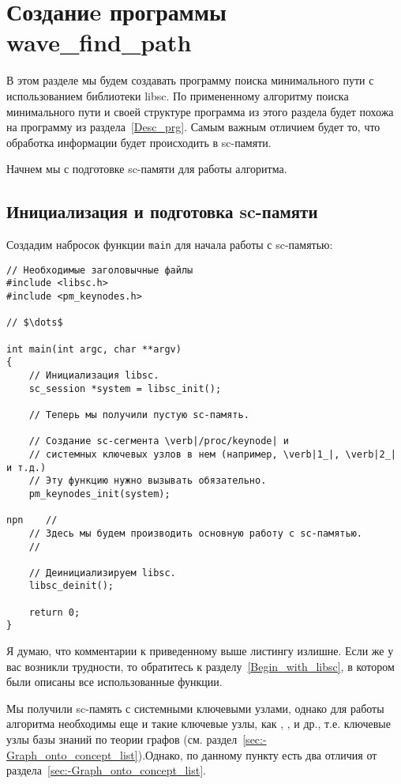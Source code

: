 \section{Созданиe программы wave\_find\_path}
\label{Desc_libscprg}

В этом разделе мы будем создавать программу поиска минимального пути с
использованием библиотеки libsc. По примененному алгоритму поиска
минимального пути и своей структуре программа из этого раздела будет
похожа на программу из раздела~\ref{Desc_prg}. Самым важным
отличием будет то, что обработка информации будет происходить в
sc-памяти.

Начнем мы с подготовке sc-памяти для работы алгоритма.

\subsection{Инициализация и подготовка sc-памяти}
\label{libscprg_init_sc_memory}

Создадим набросок функции \lstinline|main| для начала работы с
sc-памятью:
\begin{lstlisting}[texcl]
// Необходимые заголовычные файлы
#include <libsc.h>
#include <pm_keynodes.h>

// $\dots$

int main(int argc, char **argv)
{
    // Инициализация libsc.
    sc_session *system = libsc_init();

    // Теперь мы получили пустую sc-память.

    // Создание sc-сегмента \verb|/proc/keynode| и
    // системных ключевых узлов в нем (например, \verb|1_|, \verb|2_| и т.д.)
    // Эту функцию нужно вызывать обязательно.
    pm_keynodes_init(system);

npn    //
    // Здесь мы будем производить основную работу с sc-памятью.
    //

    // Деинициализируем libsc.
    libsc_deinit();

    return 0;
}
\end{lstlisting}

Я думаю, что комментарии к приведенному выше листингу излишне. Если же
у вас возникли трудности, то обратитесь к
разделу~\ref{Begin_with_libsc}, в котором были описаны все
использованные функции.

Мы получили sc-память с системными ключевыми узлами, однако для работы
алгоритма необходимы еще и такие ключевые узлы, как
, ,  и др.,
т.е. ключевые узлы базы знаний по теории графов
(см. раздел~\ref{sec:-Graph_onto_concept_list}).Однако, по данному
пункту есть два отличия от раздела~\ref{sec:-Graph_onto_concept_list}.


